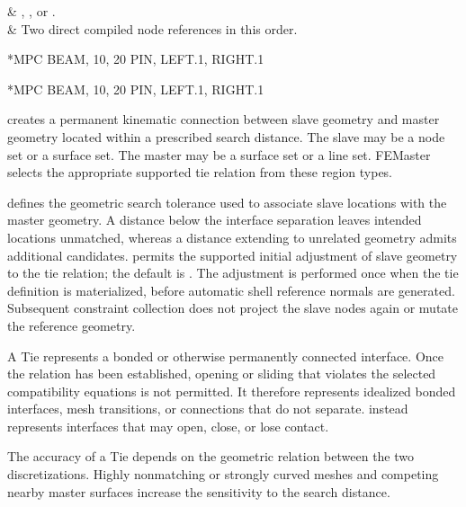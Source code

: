 \begin{keyworddata}
 & , , or . \\
 & Two direct compiled node references in this order. \\
\end{keyworddata}

\exampleheading
\begin{dialectexamples}
\begin{femasterdeck}
*MPC
BEAM, 10, 20
PIN, LEFT.1, RIGHT.1
\end{femasterdeck}
\begin{abaqusdeck}
*MPC
BEAM, 10, 20
PIN, LEFT.1, RIGHT.1
\end{abaqusdeck}
\end{dialectexamples}


 creates a permanent kinematic connection between slave geometry and master geometry located within a prescribed search distance. The slave may be a node set or a surface set. The master may be a surface set or a line set. FEMaster selects the appropriate supported tie relation from these region types.

 defines the geometric search tolerance used to associate slave locations with the master geometry. A distance below the interface separation leaves intended locations unmatched, whereas a distance extending to unrelated geometry admits additional candidates.  permits the supported initial adjustment of slave geometry to the tie relation; the default is . The adjustment is performed once when the tie definition is materialized, before automatic shell reference normals are generated. Subsequent constraint collection does not project the slave nodes again or mutate the reference geometry.

A Tie represents a bonded or otherwise permanently connected interface. Once the relation has been established, opening or sliding that violates the selected compatibility equations is not permitted. It therefore represents idealized bonded interfaces, mesh transitions, or connections that do not separate.  instead represents interfaces that may open, close, or lose contact.

The accuracy of a Tie depends on the geometric relation between the two discretizations. Highly nonmatching or strongly curved meshes and competing nearby master surfaces increase the sensitivity to the search distance.

